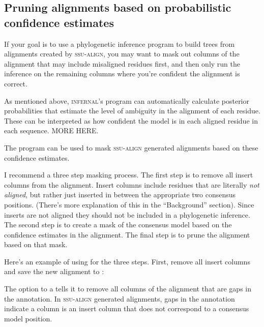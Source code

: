 \begin{comment}
To convert the alignment to fasta format that includes gaps, you can use the
\prog{scripts/stk2aln\_fa.pl} script. 
\end{comment}

\subsection{Pruning alignments based on probabilistic confidence
  estimates}

If your goal is to use a phylogenetic inference program to build trees
from alignments created by \textsc{ssu-align}, you may want to mask
out columns of the alignment that may include misaligned residues
first, and then only run the inference on the remaining columns where
you're confident the alignment is correct. 

As mentioned above, \textsc{infernal}'s  program
can automatically calculate posterior probabilities that estimate the
level of ambiguity in the alignment of each residue. These can be
interpreted as how confident the model is in each aligned residue in
each sequence.  MORE HERE.

The  program can be used to mask
\textsc{ssu-align} generated alignments based on these confidence estimates.

I recommend a three step masking process. The first step is to remove
all insert columns from the alignment. Insert columns include residues
that are literally \emph{not aligned}, but rather just inserted in
between the appropriate two consensus positions. (There's more
explanation of this in the ``Background'' section).  Since inserts are
not aligned they should not be included in a phylogenetic inference.
The second step is to create a mask of the consensus model based on
the confidence estimates in the alignment. The final step is to prune
the alignment based on that mask.

Here's an example of using  for the three steps. 
First, remove all insert columns and save the new alignment to 
:


The  option to a tells it to remove all
columns of the alignment that are gaps in the 
annotation. In \textsc{ssu-align} generated alignments, gaps in the
 annotation indicate a column is an insert column that
does not correspond to a consensus model position.

